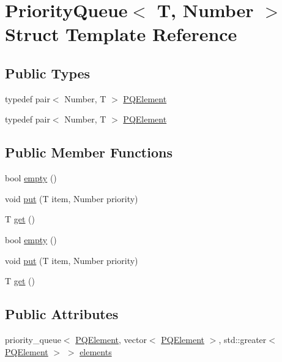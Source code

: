 \hypertarget{structPriorityQueue}{}\section{Priority\+Queue$<$ T, Number $>$ Struct Template Reference}
\label{structPriorityQueue}
\subsection*{Public Types}
\begin{DoxyCompactItemize}
\item 
typedef pair$<$ Number, T $>$ \mbox{\hyperlink{structPriorityQueue_ae86a19aae3f9a32a1d76dfdab34eb70b}{P\+Q\+Element}}
\item 
typedef pair$<$ Number, T $>$ \mbox{\hyperlink{structPriorityQueue_ae86a19aae3f9a32a1d76dfdab34eb70b}{P\+Q\+Element}}
\end{DoxyCompactItemize}
\subsection*{Public Member Functions}
\begin{DoxyCompactItemize}
\item 
bool \mbox{\hyperlink{structPriorityQueue_a422e38d0c3b8398dc6e4867bb4ceec41}{empty}} ()
\item 
void \mbox{\hyperlink{structPriorityQueue_a9361c94664b98a15a91a595d65c9846c}{put}} (T item, Number priority)
\item 
T \mbox{\hyperlink{structPriorityQueue_ab211c9583fda5c1a6352021444af5f0e}{get}} ()
\item 
bool \mbox{\hyperlink{structPriorityQueue_a422e38d0c3b8398dc6e4867bb4ceec41}{empty}} ()
\item 
void \mbox{\hyperlink{structPriorityQueue_a9361c94664b98a15a91a595d65c9846c}{put}} (T item, Number priority)
\item 
T \mbox{\hyperlink{structPriorityQueue_ab211c9583fda5c1a6352021444af5f0e}{get}} ()
\end{DoxyCompactItemize}
\subsection*{Public Attributes}
\begin{DoxyCompactItemize}
\item 
priority\+\_\+queue$<$ \mbox{\hyperlink{structPriorityQueue_ae86a19aae3f9a32a1d76dfdab34eb70b}{P\+Q\+Element}}, vector$<$ \mbox{\hyperlink{structPriorityQueue_ae86a19aae3f9a32a1d76dfdab34eb70b}{P\+Q\+Element}} $>$, std\+::greater$<$ \mbox{\hyperlink{structPriorityQueue_ae86a19aae3f9a32a1d76dfdab34eb70b}{P\+Q\+Element}} $>$ $>$ \mbox{\hyperlink{structPriorityQueue_a289cc383607c83fe77a0d571cb06bb01}{elements}}
\end{DoxyCompactItemize}


